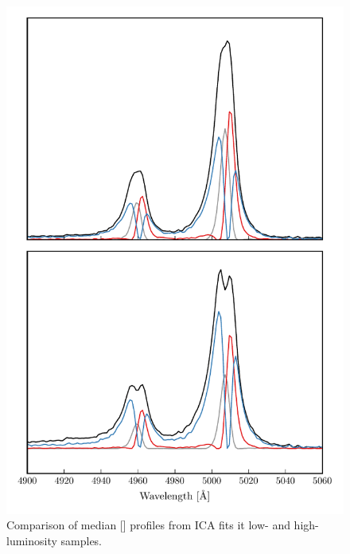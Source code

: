 \begin{figure}
    \centering
    \includegraphics[width=\columnwidth]{figures/chapter04/mfica_components_oiii_comparison.pdf} 
    \caption{Comparison of median [] profiles from ICA fits it low- and high-luminosity samples.}     
    \label{fig:mfica_components_oiii_comparison}
\end{figure}

